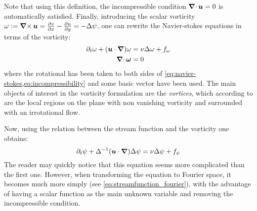 \documentclass[../main.tex]{subfiles}
\begin{document}
Note that using this definition, the incompressible condition $\operatorname{\boldsymbol{\nabla}\cdot} \boldsymbol{u}=0$ is automatically satisfied. Finally, introducing the scalar vorticity $\omega := \operatorname{\boldsymbol{\nabla}\times} \boldsymbol{u} = \pdv{v}{x} - \pdv{u}{y}=-\Delta \psi$, one can rewrite the Navier-stokes equations in terms of the vorticity:
\begin{align}
	\partial_t \omega + (\boldsymbol{u} \cdot \grad) \omega & = \nu \Delta \omega + f_\omega \\
	\operatorname{\boldsymbol{\nabla}\cdot}{\boldsymbol{\omega}}                              & = 0
\end{align}
where the rotational has been taken to both sides of \cref{eq:navier-stokes,eq:incompressibility} and some basic vector have been used. The main objects of interest in the vorticity formulation are the \emph{vortices}, which according to \cite{Saffman} are the local regions on the plane with non vanishing vorticity and surrounded with an irrotational flow.

Now, using the relation between the stream function and the vorticity one obtains:
\begin{equation}\label{eq:streamfunction}
	\partial_t \psi + \Delta^{-1} (\boldsymbol{u} \cdot \grad) \Delta \psi = \nu \Delta \psi + f_\psi
\end{equation}
The reader may quickly notice that this equation seems more complicated than the first one. However, when transforming the equation to Fourier space, it becomes much more simply (see \cref{eq:streamfunction_fourier}), with the advantage of having a scalar function as the main unknown variable and removing the incompressible condition.
\end{document}
